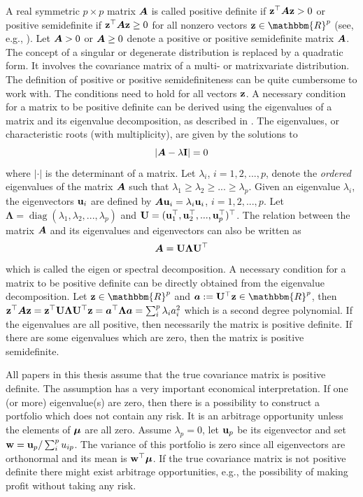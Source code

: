 \documentclass[12pt, oneside]{book}\usepackage{knitr}
\begin{document}
A real symmetric $p\times p$ matrix $\mbox{\boldmath$A$}$ is called positive definite if $\mathbf{z}^\top \mbox{\boldmath$A$} \mathbf{z} > 0$ or positive semidefinite if $\mathbf{z}^\top \mbox{\boldmath$A$} \mathbf{z} \geq 0$ for all nonzero vectors $\bz \in \mathbbm{R}^p$ (see, e.g., \citet[ch 14.2]{harville1997matrix}).
Let $\mbox{\boldmath$A$} > 0$ or $\mbox{\boldmath$A$} \geq 0$ denote a positive or positive semidefinite matrix $\mbox{\boldmath$A$}$. 
The concept of a singular or degenerate distribution is replaced by a quadratic form.
It involves the covariance matrix of a multi- or matrixvariate distribution.
The definition of positive or positive semidefiniteness can be quite cumbersome to work with. 
The conditions need to hold for all vectors $\mathbf{z}$. 
A necessary condition for a matrix to be positive definite can be derived using the eigenvalues of a matrix and its eigenvalue decomposition, as described in \citet[ch. 21]{harville1997matrix}.
The eigenvalues, or characteristic roots (with multiplicity), are given by the solutions to
\begin{equation}\label{def:eigenvalue} 
	\left|\mbox{\boldmath$A$} - \lambda \mathbf{I}\right| = 0
\end{equation}
where $|\cdot|$ is the determinant of a matrix.
Let $\lambda_i$, $i=1,2,...,p$, denote the \textit{ordered} eigenvalues of the matrix $\mbox{\boldmath$A$}$ such that $\lambda_1\geq \lambda_2 \geq ... \geq \lambda_p$.
Given an eigenvalue $\lambda_i$, the eigenvectors $\mathbf{u}_i$ are defined by $\mbox{\boldmath$A$} \mathbf{u}_i = \lambda_i \mathbf{u}_i$, $i=1,2,...,p$. 
Let $\boldsymbol{\Lambda} = \operatorname{diag}(\lambda_1, \lambda_2,...,\lambda_p)$ and $\mathbf{U}= (\mathbf{u}_1^\top, \mathbf{u}_2^\top, ..., \mathbf{u}_p^\top)^\top$. 
The relation between the matrix $\mbox{\boldmath$A$}$ and its eigenvalues and eigenvectors can also be written as 
\begin{equation}\label{eqn:eigenvalue_decomp}
	\mbox{\boldmath$A$} = \mathbf{U} \boldsymbol{\Lambda} \mathbf{U}^\top
\end{equation}
which is called the eigen or spectral decomposition.
A necessary condition for a matrix to be positive definite can be directly obtained from the eigenvalue decomposition. 
Let $\bz\in \mathbbm{R}^p$ and $\ba := \bU^{\top} \bz \in \mathbbm{R}^p$, then $\mathbf{z}^\top \mbox{\boldmath$A$} \mathbf{z} = \mathbf{z}^\top \mathbf{U} \boldsymbol{\Lambda} \mathbf{U} ^{\top} \mathbf{z} = \mbox{\boldmath$a$}^\top \boldsymbol{\Lambda} \mbox{\boldmath$a$} = \sum_i^p \lambda_i a_i^2$ which is a second degree polynomial. 
If the eigenvalues are all positive, then necessarily the matrix is positive definite. 
If there are some eigenvalues which are zero, then the matrix is positive semidefinite. 

All papers in this thesis assume that the true covariance matrix is positive definite. 
The assumption has a very important economical interpretation.
If one (or more) eigenvalue(s) are zero, then there is a possibility to construct a portfolio which does not contain any risk.
It is an arbitrage opportunity unless the elements of $\mbox{\boldmath$\mu$}$ are all zero.
Assume $\lambda_p=0$, let $\mathbf{u}_p$ be its eigenvector and set $\mathbf{w} = \mathbf{u}_p / \sum_i^p u_{ip}$. 
The variance of this portfolio is zero since all eigenvectors are orthonormal and its mean is $\mathbf{w}^\top \mbox{\boldmath$\mu$}$.
If the true covariance matrix is not positive definite there might exist arbitrage opportunities, e.g., the possibility of making profit without taking any risk.
\end{document}
